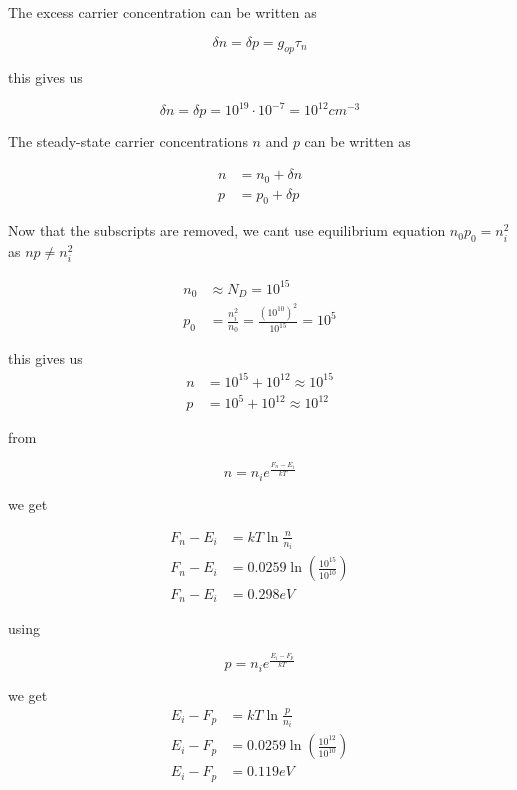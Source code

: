 The excess carrier concentration can be written as 

\begin{equation*}
    \delta n=\delta p=g_{op}\tau_n
\end{equation*}

this gives us 

\begin{equation*}
    \delta n=\delta p=10^{19}\cdot10^{-7}=10^{12}cm^{-3}
\end{equation*}

The steady-state carrier concentrations $n$ and $p$ can be written as

\begin{align*}
    n&=n_0+\delta n\\
    p&=p_0+\delta p
\end{align*}

Now that the subscripts are removed, we cant use equilibrium equation $n_0p_0=n_i^2$ as $np \neq n_i^2$

\begin{align*}
    n_0&\approx N_D=10^{15}\\
    p_0&=\frac{n_i^2}{n_0}=\frac{\left(10^{10}\right)^2}{10^{15}}=10^5
\end{align*}

this gives us
\begin{align*}
    n&=10^{15}+10^{12}\approx10^{15}\\
    p&=10^5+10^{12}\approx 10^{12}
\end{align*}

from 

\begin{equation*}
    n=n_ie^{\frac{F_n-E_i}{kT}}
\end{equation*}

we get

\begin{align*}
    F_n-E_i&=kT \ln \frac{n}{n_i}\\
    F_n-E_i&=0.0259 \ln \left(\frac{10^{15}}{10^{10}}\right)\\
    F_n-E_i&=0.298eV
\end{align*}

using 

\begin{equation*}
    p=n_ie^{\frac{E_i-F_p}{kT}}
\end{equation*}

we get
\begin{align*}
    E_i-F_p&=kT \ln \frac{p}{n_i}\\
    E_i-F_p&=0.0259 \ln \left(\frac{10^{12}}{10^{10}}\right)\\
    E_i-F_p&=0.119eV
\end{align*}

